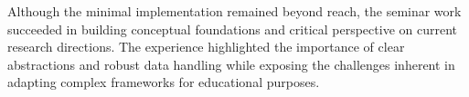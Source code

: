 Although the minimal implementation remained beyond reach, the seminar work succeeded in building conceptual foundations and critical perspective on current research directions. The experience highlighted the importance of clear abstractions and robust data handling while exposing the challenges inherent in adapting complex frameworks for educational purposes.


